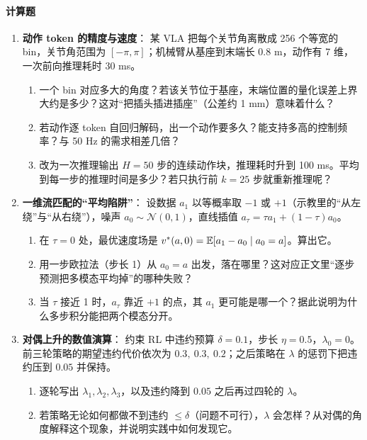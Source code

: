 \paragraph{计算题}
\begin{enumerate}
    \item \textbf{动作 token 的精度与速度}：
    某 VLA 把每个关节角离散成 256 个等宽的 bin，关节角范围为 $[-\pi, \pi]$；机械臂从基座到末端长 $0.8$ m，动作有 7 维，一次前向推理耗时 30 ms。
    \begin{enumerate}
        \item 一个 bin 对应多大的角度？若该关节位于基座，末端位置的量化误差上界大约是多少？这对“把插头插进插座”（公差约 1 mm）意味着什么？
        \item 若动作逐 token 自回归解码，出一个动作要多久？能支持多高的控制频率？与 50 Hz 的需求相差几倍？
        \item 改为一次推理输出 $H = 50$ 步的连续动作块，推理耗时升到 100 ms。平均到每一步的推理时间是多少？若只执行前 $k = 25$ 步就重新推理呢？
    \end{enumerate}

    \item \textbf{一维流匹配的“平均陷阱”}：
    设数据 $a_1$ 以等概率取 $-1$ 或 $+1$（示教里的“从左绕”与“从右绕”），噪声 $a_0 \sim \mathcal{N}(0, 1)$，直线插值 $a_\tau = \tau a_1 + (1 - \tau) a_0$。
    \begin{enumerate}
        \item 在 $\tau = 0$ 处，最优速度场是 $v^*(a, 0) = \mathbb{E}[a_1 - a_0 \mid a_0 = a]$。算出它。
        \item 用一步欧拉法（步长 1）从 $a_0 = a$ 出发，落在哪里？这对应正文里“逐步预测把多模态平均掉”的哪种失败？
        \item 当 $\tau$ 接近 1 时，$a_\tau$ 靠近 $+1$ 的点，其 $a_1$ 更可能是哪一个？据此说明为什么多步积分能把两个模态分开。
    \end{enumerate}

    \item \textbf{对偶上升的数值演算}：
    约束 RL 中违约预算 $\delta = 0.1$，步长 $\eta = 0.5$，$\lambda_0 = 0$。前三轮策略的期望违约代价依次为 $0.3,\ 0.3,\ 0.2$；之后策略在 $\lambda$ 的惩罚下把违约压到 $0.05$ 并保持。
    \begin{enumerate}
        \item 逐轮写出 $\lambda_1, \lambda_2, \lambda_3$，以及违约降到 $0.05$ 之后再过四轮的 $\lambda$。
        \item 若策略无论如何都做不到违约 $\le \delta$（问题不可行），$\lambda$ 会怎样？从对偶的角度解释这个现象，并说明实践中如何发现它。
    \end{enumerate}
\end{enumerate}

